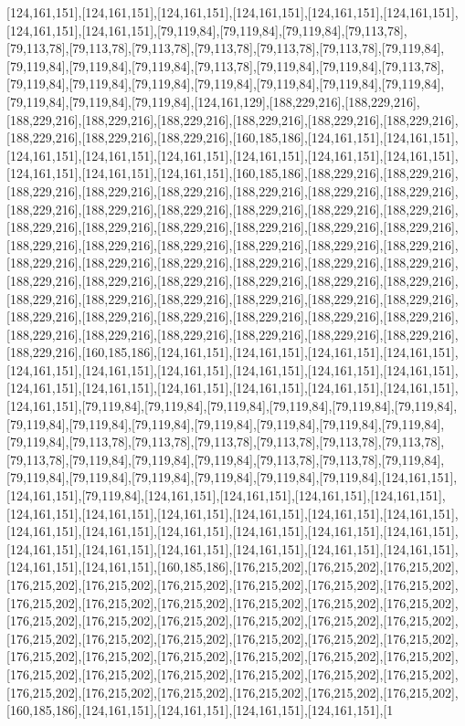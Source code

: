 [124,161,151],[124,161,151],[124,161,151],[124,161,151],[124,161,151],[124,161,151],[124,161,151],[124,161,151],[79,119,84],[79,119,84],[79,119,84],[79,113,78],[79,113,78],[79,113,78],[79,113,78],[79,113,78],[79,113,78],[79,113,78],[79,119,84],[79,119,84],[79,119,84],[79,119,84],[79,113,78],[79,119,84],[79,119,84],[79,113,78],[79,119,84],[79,119,84],[79,119,84],[79,119,84],[79,119,84],[79,119,84],[79,119,84],[79,119,84],[79,119,84],[79,119,84],[124,161,129],[188,229,216],[188,229,216],[188,229,216],[188,229,216],[188,229,216],[188,229,216],[188,229,216],[188,229,216],[188,229,216],[188,229,216],[188,229,216],[160,185,186],[124,161,151],[124,161,151],[124,161,151],[124,161,151],[124,161,151],[124,161,151],[124,161,151],[124,161,151],[124,161,151],[124,161,151],[124,161,151],[160,185,186],[188,229,216],[188,229,216],[188,229,216],[188,229,216],[188,229,216],[188,229,216],[188,229,216],[188,229,216],[188,229,216],[188,229,216],[188,229,216],[188,229,216],[188,229,216],[188,229,216],[188,229,216],[188,229,216],[188,229,216],[188,229,216],[188,229,216],[188,229,216],[188,229,216],[188,229,216],[188,229,216],[188,229,216],[188,229,216],[188,229,216],[188,229,216],[188,229,216],[188,229,216],[188,229,216],[188,229,216],[188,229,216],[188,229,216],[188,229,216],[188,229,216],[188,229,216],[188,229,216],[188,229,216],[188,229,216],[188,229,216],[188,229,216],[188,229,216],[188,229,216],[188,229,216],[188,229,216],[188,229,216],[188,229,216],[188,229,216],[188,229,216],[188,229,216],[188,229,216],[188,229,216],[188,229,216],[188,229,216],[188,229,216],[188,229,216],[188,229,216],[160,185,186],[124,161,151],[124,161,151],[124,161,151],[124,161,151],[124,161,151],[124,161,151],[124,161,151],[124,161,151],[124,161,151],[124,161,151],[124,161,151],[124,161,151],[124,161,151],[124,161,151],[124,161,151],[124,161,151],[124,161,151],[79,119,84],[79,119,84],[79,119,84],[79,119,84],[79,119,84],[79,119,84],[79,119,84],[79,119,84],[79,119,84],[79,119,84],[79,119,84],[79,119,84],[79,119,84],[79,119,84],[79,113,78],[79,113,78],[79,113,78],[79,113,78],[79,113,78],[79,113,78],[79,113,78],[79,119,84],[79,119,84],[79,119,84],[79,113,78],[79,113,78],[79,119,84],[79,119,84],[79,119,84],[79,119,84],[79,119,84],[79,119,84],[79,119,84],[124,161,151],[124,161,151],[79,119,84],[124,161,151],[124,161,151],[124,161,151],[124,161,151],[124,161,151],[124,161,151],[124,161,151],[124,161,151],[124,161,151],[124,161,151],[124,161,151],[124,161,151],[124,161,151],[124,161,151],[124,161,151],[124,161,151],[124,161,151],[124,161,151],[124,161,151],[124,161,151],[124,161,151],[124,161,151],[124,161,151],[124,161,151],[160,185,186],[176,215,202],[176,215,202],[176,215,202],[176,215,202],[176,215,202],[176,215,202],[176,215,202],[176,215,202],[176,215,202],[176,215,202],[176,215,202],[176,215,202],[176,215,202],[176,215,202],[176,215,202],[176,215,202],[176,215,202],[176,215,202],[176,215,202],[176,215,202],[176,215,202],[176,215,202],[176,215,202],[176,215,202],[176,215,202],[176,215,202],[176,215,202],[176,215,202],[176,215,202],[176,215,202],[176,215,202],[176,215,202],[176,215,202],[176,215,202],[176,215,202],[176,215,202],[176,215,202],[176,215,202],[176,215,202],[176,215,202],[176,215,202],[176,215,202],[176,215,202],[176,215,202],[176,215,202],[160,185,186],[124,161,151],[124,161,151],[124,161,151],[124,161,151],[1